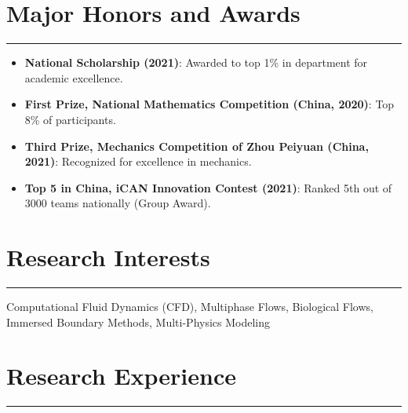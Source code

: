 \documentclass[11pt]{article}
\begin{document}
\vspace{2mm}

\section*{Major Honors and Awards}
\hrule

\begin{itemize}[leftmargin=*,itemsep=1pt]
    \item \textbf{National Scholarship (2021)}: Awarded to top 1\% in department for academic excellence.
    \item \textbf{First Prize, National Mathematics Competition (China, 2020)}: Top 8\% of participants.
    \item \textbf{Third Prize, Mechanics Competition of Zhou Peiyuan (China, 2021)}: Recognized for excellence in mechanics.
    \item \textbf{Top 5 in China, iCAN Innovation Contest (2021)}: Ranked 5th out of 3000 teams nationally (Group Award).
\end{itemize}

\section*{Research Interests}
\hrule

\noindent Computational Fluid Dynamics (CFD), Multiphase Flows, Biological Flows, Immersed Boundary Methods, Multi-Physics Modeling

\section*{Research Experience}
\hrule
\end{document}
